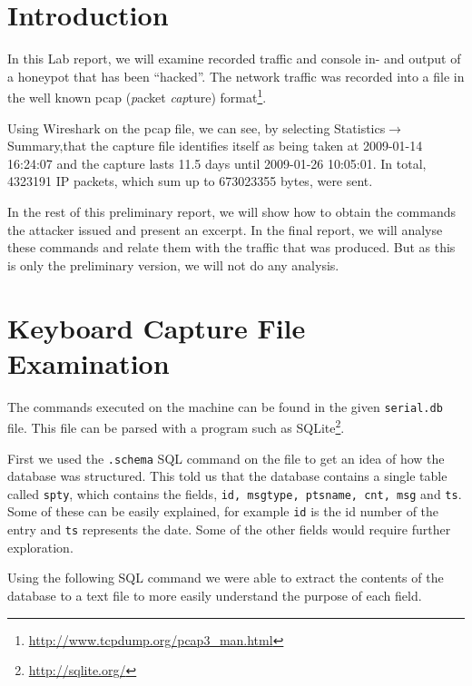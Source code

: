 \documentclass[a4paper,
    11pt,
    normalheadings,
    parindent,
    UKenglish,
    abstracton,
    ]{scrartcl}
\title{\mytitle{}}
\author{
    cand. Dipl. Inf. Tobias Müller <\href{mailto:muellet2@computing.dcu.ie?subject=ss10-forensic-lab01}{muellet2@}>, 59212333 \and
    BSc. Anthony Walters <\href{mailto:waltera3@computing.dcu.ie?subject=ss10-forensic-lab01}{waltera3@}>, 59213102 \and Conor Lynch <\href{mailto:conor.lynch36@mail.dcu.ie}{lynchc36@}>, 55619599}
\date{\today}
\newcommand{\FIXME}[1]{\mbox{}\marginpar{\footnotesize\raggedright\hspace{0pt}\color{red}\emph{#1}}}
\begin{document}
\maketitle


\section{Introduction}
In this Lab report, we will examine recorded traffic and console in- and output of a honeypot that has been ``hacked''.
The network traffic was recorded into a file in the well known pcap (\emph{p}acket \emph{cap}ture) format\footnote{\url{http://www.tcpdump.org/pcap3_man.html}}.

Using Wireshark on the pcap file, we can see, by selecting Statistics$\rightarrow$Summary,that the capture file identifies itself as being taken at 2009-01-14 16:24:07 and the capture lasts 11.5 days until 2009-01-26 10:05:01.
In total, 4323191 IP packets, which sum up to 673023355 bytes,   were sent.

In the rest of this preliminary report, we will show how to obtain the commands the attacker issued and present an excerpt.
In the final report, we will analyse these commands and relate them with the traffic that was produced.
But as this is only the preliminary version, we will not do any analysis.

\section{Keyboard Capture File Examination}

The commands executed on the machine can be found in the given \texttt{serial.db} file.
This file can be parsed with a program such as SQLite\footnote{\url{http://sqlite.org/}}.

First we used the \texttt{.schema} SQL command on the file to get an idea of how the database was structured.
This told us that the database contains a single table called \texttt{spty}, which contains the fields, \texttt{id, msgtype, ptsname, cnt, msg} and \texttt{ts}.
Some of these can be easily explained, for example \texttt{id} is the id number of the entry and \texttt{ts} represents the date.
Some of the other fields would require further exploration.

Using the following SQL command we were able to extract the contents of the database to a text file to more easily understand the purpose of each field.
\end{document}
